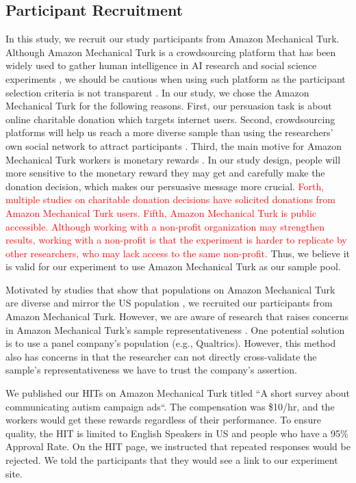 \subsection{Participant Recruitment}
\label{sub:Participant Recruitment}
In this study, we recruit our study participants from Amazon Mechanical Turk. Although Amazon Mechanical Turk is a crowdsourcing platform that has been widely used to gather human intelligence in AI research and social science experiments \cite{ paolacci2014inside,berinsky2012evaluating,buhrmester2011amazon,branas2018gender,lee2013does,saunders2016no,arechar2017turking,sussman2015framing}, we should be cautious when using such platform as the participant selection criteria is not transparent \cite{landers2015inconvenient,paolacci2010running}. In our study, we chose the Amazon Mechanical Turk for the following reasons. First, our persuasion task is about online charitable donation which targets internet users. Second, crowdsourcing platforms will help us reach a more diverse sample than using the researchers' own social network to attract participants \cite{buhrmester2011amazon}. Third, the main motive for Amazon Mechanical Turk workers is monetary rewards \cite{berinsky2012evaluating}. In our study design, people will more sensitive to the monetary reward they may get and carefully make the donation decision, which makes our persuasive message more crucial. \textcolor{red}{Forth, multiple studies on charitable donation decisions have solicited donations from Amazon Mechanical Turk users\cite{branas2018gender,lee2013does,saunders2016no,arechar2017turking,sussman2015framing}. Fifth, Amazon Mechanical Turk is public accessible. Although working with a non-profit organization may strengthen results, working with a non-profit is that the experiment is harder to replicate by other researchers, who may lack access to the same non-profit.} Thus, we believe it is valid for our experiment to use Amazon Mechanical Turk as our sample pool. 

Motivated by studies that show that populations on Amazon Mechanical Turk are diverse and mirror the US population \cite{buhrmester2011amazon,behrend2011viability,berinsky2012evaluating}, we recruited our participants from Amazon Mechanical Turk. However, we are aware of research that raises concerns in Amazon Mechanical Turk's sample representativeness \cite{landers2015inconvenient,paolacci2010running}. One potential solution is to use a panel company's population (e.g., Qualtrics). However, this method also has concerns in that the researcher can not directly cross-validate the sample's representativeness we have to trust the company's assertion.

We published our HITs on Amazon Mechanical Turk titled ``A short survey about communicating autism campaign ads``. The compensation was \$10/hr, and the workers would get these rewards regardless of their performance. To ensure quality, the HIT is limited to English Speakers in US and people who have a 95\% Approval Rate. On the HIT page, we instructed that repeated responses would be rejected. We told the participants that they would see a link to our experiment site. 

